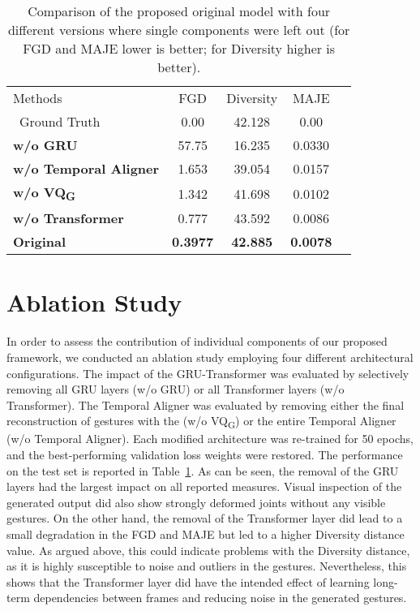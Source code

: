 \documentclass[sigconf]{acmart}
\begin{document}
\begin{table}[t]
  \centering
  \caption{Comparison of the proposed original model with four different versions where single components were left out (for FGD and MAJE lower is better; for Diversity higher is better).}
  \begin{tabular}{lcccc}
    \toprule
    Methods & FGD  & Diversity  & MAJE \\\
    Ground Truth & 0.00 & 42.128 & 0.00\\
    \midrule
    \textbf{w/o GRU} & 57.75 & 16.235 & 0.0330\\
    \textbf{w/o Temporal Aligner} & 1.653 & 39.054 & 0.0157\\
    \textbf{w/o VQ\textsubscript{G}} & 1.342 & 41.698 & 0.0102\\
    
    \textbf{w/o Transformer} & 0.777 & 43.592 & 0.0086\\
    \midrule
    \textbf{Original} & \textbf{0.3977} & \textbf{42.885} & \textbf{0.0078}\\ 
    \bottomrule
  \end{tabular}
  \label{tbl:ablation}
\end{table}

\section{Ablation Study}
In order to assess the contribution of individual components of our proposed framework, we conducted an ablation study employing four different architectural configurations. The impact of the GRU-Transformer was evaluated by selectively removing all GRU layers (w/o GRU) or all Transformer layers (w/o Transformer). The Temporal Aligner was evaluated by removing either the final reconstruction of gestures with the  (w/o VQ\textsubscript{G}) or the entire Temporal Aligner (w/o Temporal Aligner). Each modified architecture was re-trained for 50 epochs, and the best-performing validation loss weights were restored. The performance on the test set is reported in Table~\ref{tbl:ablation}. As can be seen, the removal of the GRU layers had the largest impact on all reported measures. Visual inspection of the generated output did also show strongly deformed joints without any visible gestures. On the other hand, the removal of the Transformer layer did lead to a small degradation in the FGD and MAJE but led to a higher Diversity distance value. As argued above, this could indicate problems with the Diversity distance, as it is highly susceptible to noise and outliers in the gestures. Nevertheless, this shows that the Transformer layer did have the intended effect of learning long-term dependencies between frames and reducing noise in the generated gestures. 
\end{document}
